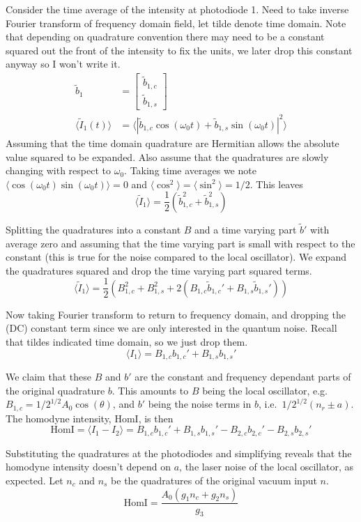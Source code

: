 \documentclass[aps,pra,superscriptaddress,reprint,nofootinbib]{revtex4-1}
\newcommand{\abs}[1]{\left\lvert #1 \right\rvert}
\newcommand{\expect}[1]{\langle #1 \rangle}
\begin{document}
Consider the time average of the intensity at photodiode 1. Need to take inverse Fourier transform of frequency domain field, let tilde denote time domain. Note that depending on quadrature convention there may need to be a constant squared out the front of the intensity to fix the units, we later drop this constant anyway so I won’t write it. 
\begin{align*}
\tilde{b}_1 &= \begin{bmatrix}
\tilde{b}_{1,c}\\ 
\tilde{b}_{1,s}
\end{bmatrix} \\
\expect{\tilde{I}_1(t)} &= \expect{\abs{\tilde{b}_{1,c} \cos(\omega_0 t) + \tilde{b}_{1,s} \sin(\omega_0 t)}^2}
\end{align*}
Assuming that the time domain quadrature are Hermitian allows the absolute value squared to be expanded. Also assume that the quadratures are slowly changing with respect to $\omega_0$. Taking time averages we note $\expect{\cos(\omega_0 t) \sin(\omega_0 t)} = 0$ and $\expect{\cos^2} = \expect{\sin^2} = 1/2$. This leaves
$$\expect{\tilde{I}_1} = \frac{1}{2} \left( \tilde{b}_{1,c}^2 + \tilde{b}_{1,s}^2 \right)$$


Splitting the quadratures into a constant $B$ and a time varying part $\tilde{b}'$ with average zero and assuming that the time varying part is small with respect to the constant (this is true for the noise compared to the local oscillator). We expand the quadratures squared and drop the time varying part squared terms.
$$\expect{\tilde{I}_1} = \frac{1}{2} \left( B_{1,c}^2 + B_{1,s}^2 + 2 \left( B_{1,c} \tilde{b}_{1,c}' + B_{1,s} \tilde{b}_{1,s}' \right) \right)$$


Now taking Fourier transform to return to frequency domain, and dropping the (DC) constant term since we are only interested in the quantum noise. Recall that tildes indicated time domain, so we just drop them.
$$\expect{I_1} = B_{1,c} b_{1,c}' + B_{1,s} b_{1,s}'$$


We claim that these $B$ and $b'$ are the constant and frequency dependant parts of the original quadrature $b$. This amounts to $B$ being the local oscillator, e.g.\ $B_{1,c} = 1/2^{1/2} A_0 \cos(\theta)$, and $b'$ being the noise terms in $b$, i.e.\ $1/2^{1/2} (n_r \pm a)$. The homodyne intensity, $\mathrm{HomI}$, is then
$$\mathrm{HomI} = \expect{I_1 - I_2} = B_{1,c} b_{1,c}' + B_{1,s} b_{1,s}' - B_{2,c} b_{2,c}' - B_{2,s} b_{2,s}'$$


Substituting the quadratures at the photodiodes and simplifying reveals that the homodyne intensity doesn’t depend on $a$, the laser noise of the local oscillator, as expected. Let $n_c$ and $n_s$ be the quadratures of the original vacuum input $n$.
$$\mathrm{HomI} = \frac{A_0(g_1 n_c + g_2 n_s)}{g_3}$$
	
\end{document}
